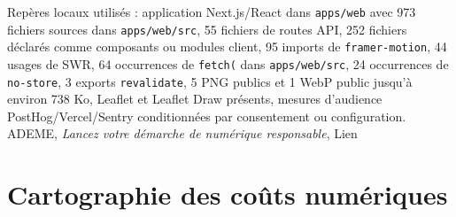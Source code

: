 \documentclass[
  10pt,
  a4paper,
  DIV=11,
  numbers=noendperiod,
  oneside]{scrreprt}
\let\oldemph\emph
\renewcommand{\emph}[1]{\oldemph{\textcolor{cmmgray}{#1}}}
\begin{document}
Repères locaux utilisés : application Next.js/React dans
\texttt{apps/web} avec 973 fichiers sources dans \texttt{apps/web/src},
55 fichiers de routes API, 252 fichiers déclarés comme composants ou
modules client, 95 imports de \texttt{framer-motion}, 44 usages de SWR,
64 occurrences de \texttt{fetch(} dans \texttt{apps/web/src}, 24
occurrences de \texttt{no-store}, 3 exports \texttt{revalidate}, 5 PNG
publics et 1 WebP public jusqu'à environ 738 Ko, Leaflet et Leaflet Draw
présents, mesures d'audience PostHog/Vercel/Sentry conditionnées par
consentement ou configuration. ADEME, \emph{Lancez votre démarche de
numérique responsable}, Lien

\section{Cartographie des coûts
numériques}\label{cartographie-des-couxfbts-numuxe9riques}
\end{document}
